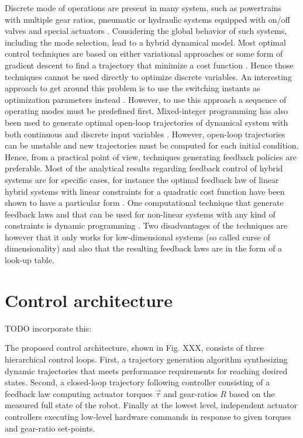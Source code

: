 Discrete mode of operations are present in many system, such as powertrains with multiple gear ratios, pneumatic or hydraulic systems equipped with on/off valves and special actuators \cite{leach_linear_2012}\cite{Wolfgang_novel_2015}\cite{lee_finger_2013}. Considering the global behavior of such systems, including the mode selection, lead to a hybrid dynamical model. Most optimal control techniques are based on either variational approaches or some form of gradient descent to find a trajectory that minimize a cost function \cite{betts_practical_2010}. Hence those techniques cannot be used directly to optimize discrete variables. An interesting approach to get around this problem is to use the switching instants as optimization parameters instead \cite{xu_optimal_2004}\cite{majdoub_hybrid_2010}. However, to use this approach a sequence of operating modes must be predefined first. Mixed-integer programming has also been used to generate optimal open-loop trajectories of dynamical system with both continuous and discrete input variables \cite{richards_spacecraft_2002} \cite{gerdts_solving_2005}. However, open-loop trajectories can be unstable and new trajectories must be computed for each initial condition. Hence, from a practical point of view, techniques generating feedback policies are preferable. Most of the analytical results regarding feedback control of hybrid systems are for specific cases, for instance the optimal feedback law of linear hybrid systems with linear constraints for a quadratic cost function have been shown to have a particular form \cite{borrelli_dynamic_2005}. One computational technique that generate feedback laws and that can be used for non-linear systems with any kind of constraints is dynamic programming \cite{donald_e._kirk_optimal_2004}. Two disadvantages of the techniques are however that it only works for low-dimensional systems (so called curse of dimensionality) and also that the resulting feedback laws are in the form of a look-up table.


\newpage

\section{Control architecture}
\label{sec:arch}

TODO incorporate this:

The proposed control architecture, shown in Fig. XXX, consists of three hierarchical control loops. First, a trajectory generation algorithm synthesizing dynamic trajectories that meets performance requirements for reaching desired states. Second, a closed-loop trajectory following controller consisting of a feedback law computing actuator torques $\vec{\tau}$ and gear-ratios $R$ based on the measured full state of the robot. Finally at the lowest level, independent actuator controllers executing low-level hardware commands in response to given torques and gear-ratio set-points. 

